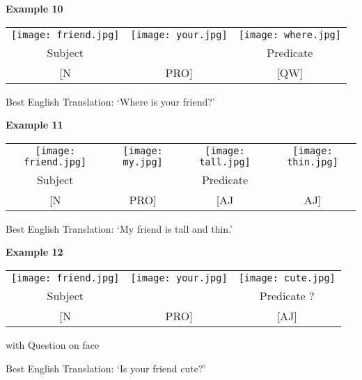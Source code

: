 \documentclass{tufte-book}
\begin{document}
\vspace{0.25cm}\noindent \textbf{Example 10}
\begin{table*}[h!]
\begin{tabular}{c  c| c}
\texttt{[image: friend.jpg]}&\texttt{[image: your.jpg]}&\texttt{[image: where.jpg]}\\
\footnotesize Subject & & \footnotesize Predicate\\
\footnotesize [N & \footnotesize PRO] & \footnotesize [QW]\\
\end{tabular}
\end{table*}

Best English Translation: `Where is your friend?'

\vspace{0.25cm}\noindent \textbf{Example 11}
\begin{table*}[h!]
\begin{tabular}{c  c| c c}
\texttt{[image: friend.jpg]}&\texttt{[image: my.jpg]}&\texttt{[image: tall.jpg]}&\texttt{[image: thin.jpg]}\\
\footnotesize Subject & & \footnotesize Predicate &\\
\footnotesize [N & \footnotesize PRO] & \footnotesize [AJ & \footnotesize AJ]\\
\end{tabular}
\end{table*}

Best English Translation: `My friend is tall and thin.'

\vspace{0.25cm}\noindent \textbf{Example 12}
\begin{table*}[h!]
\begin{tabular}{c  c| c}
\texttt{[image: friend.jpg]}&\texttt{[image: your.jpg]}&\texttt{[image: cute.jpg]}\\
\footnotesize Subject & & \footnotesize Predicate ?\\
\footnotesize [N & \footnotesize PRO] & \footnotesize [AJ]\\
\end{tabular}
\end{table*}

\hspace{5.5cm} with Question on face

Best English Translation: `Is your friend cute?'
\end{document}
